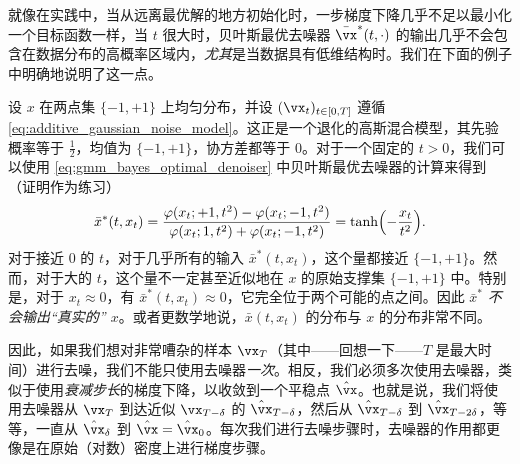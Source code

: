 \documentclass[../../book-main.tex]{subfiles}
\begin{document}
就像在实践中，当从远离最优解的地方初始化时，一步梯度下降几乎不足以最小化一个目标函数一样，当 \(t\) 很大时，贝叶斯最优去噪器 \(\bar{\vx}^{\ast}(t, \cdot)\) 的输出几乎不会包含在数据分布的高概率区域内，\textit{尤其}是当数据具有低维结构时。我们在下面的例子中明确地说明了这一点。
\begin{example}[去噪一个两点混合分布]\label{example:denoising_twopoints}
	设 \(x\) 在两点集 \(\{-1, +1\}\) 上均匀分布，并设 \((\vx_{t})_{t \in [0, T]}\) 遵循 \eqref{eq:additive_gaussian_noise_model}。这正是一个退化的高斯混合模型，其先验概率等于 \(\frac{1}{2}\)，均值为 \(\{-1, +1\}\)，协方差都等于 \(0\)。对于一个固定的 \(t > 0\)，我们可以使用 \eqref{eq:gmm_bayes_optimal_denoiser} 中贝叶斯最优去噪器的计算来得到（证明作为练习）
	\begin{equation}
		\bar{x}^{\ast}(t, x_{t}) = \frac{\phi(x_{t} ; +1, t^{2}) - \phi(x_{t}
		; -1, t^{2})}{\phi(x_{t} ; 1, t^{2}) + \phi(x_{t} ; -1, t^{2})} = \tanh\rp{-\frac{x_{t}}{t^{2}}}.
	\end{equation}
	对于接近 \(0\) 的 \(t\)，对于几乎所有的输入 \(\bar{x}^{\ast}(t, x_{t})\)，这个量都接近 \(\{-1, +1\}\)。然而，对于大的 \(t\)，这个量不一定甚至近似地在 \(x\) 的原始支撑集 \(\{-1, +1\}\) 中。特别是，对于 \(x_{t} \approx 0\)，有 \(\bar{x}^{\ast}(t, x_{t}) \approx 0\)，它完全位于两个可能的点之间。因此 \(\bar{x}^{\ast}\) \textit{不会输出“真实的” \(x\)}。或者更数学地说，\(\bar{x}(t, x_{t})\) 的分布与 \(x\) 的分布非常不同。
\end{example}

因此，如果我们想对非常嘈杂的样本 \(\vx_{T}\)（其中——回想一下——\(T\) 是最大时间）进行去噪，我们不能只使用去噪器\textit{一次}。相反，我们必须多次使用去噪器，类似于使用\textit{衰减步长}的梯度下降，以收敛到一个平稳点 \(\hat{\vx}\)。也就是说，我们将使用去噪器从 \(\vx_{T}\) 到达近似 \(\vx_{T - \delta}\) 的 \(\hat{\vx}_{T - \delta}\)，然后从 \(\hat{\vx}_{T - \delta}\) 到 \(\hat{\vx}_{T - 2\delta}\)，等等，一直从 \(\hat{\vx}_{\delta}\) 到 \(\hat{\vx} = \hat{\vx}_{0}\)。每次我们进行去噪步骤时，去噪器的作用都更像是在原始（对数）密度上进行梯度步骤。
\end{document}
